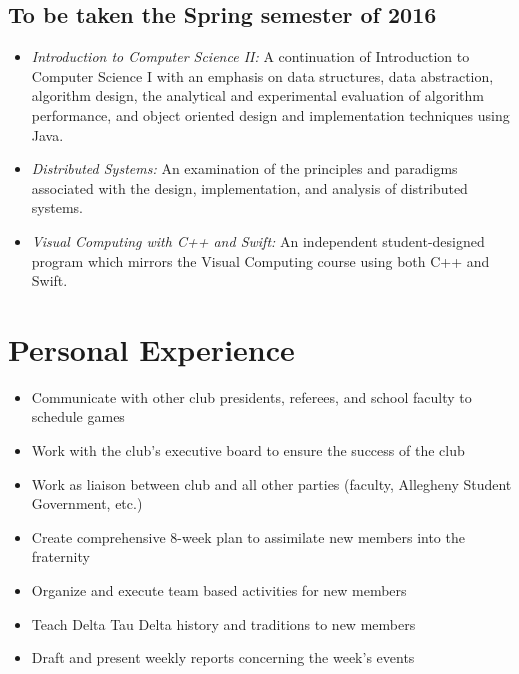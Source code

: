 \documentclass[11pt,a4paper,sans]{moderncv} %
\begin{document}
{{\subsection{To be taken the Spring semester of 2016}
\begin{itemize}
\item{\textit{Introduction to Computer Science II: }{A continuation of Introduction to Computer Science I with an emphasis on data structures, data abstraction, algorithm design, the analytical and experimental evaluation of algorithm performance, and object oriented design and implementation techniques using Java.}}
\item{\textit{Distributed Systems: }{An examination of the principles and paradigms associated with the design, implementation, and analysis of distributed systems.}}
\item{\textit{Visual Computing with C++ and Swift: }{ An independent student-designed program which mirrors the Visual Computing course using both C++ and Swift.}}
\end{itemize}

\section{Personal Experience}
\begin{itemize}
\item{Communicate with other club presidents, referees, and school faculty to schedule games}
\item{Work with the club's executive board to ensure the success of the club}
\item{Work as liaison between club and all other parties (faculty, Allegheny Student Government, etc.) }
\end{itemize}

\begin{itemize}
\item{Create comprehensive 8-week plan to assimilate new members into the fraternity}
\item{Organize and execute team based activities for new members}
\item{Teach Delta Tau Delta history and traditions to new members}
\item{Draft and present weekly reports concerning the week's events}
\end{itemize}

}}
\end{document}
